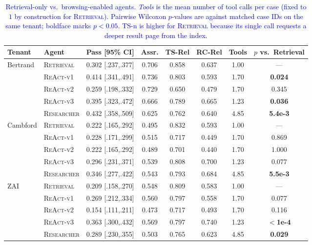 \begin{table}[h]
\centering
\color{blue}
\caption{\textcolor{blue}{Retrieval-only vs.\ browsing-enabled agents. \textit{Tools} is the mean number of tool calls per case (fixed to $1$ by construction for \textsc{Retrieval}). Pairwise Wilcoxon $p$-values are against matched case IDs on the same tenant; boldface marks $p<0.05$. TS-n is higher for \textsc{Retrieval} because its single call requests a deeper result page from the index.}}
\label{tab:tool_ablation}
\small
\begin{tabular}{llcccccc}
\toprule
\textbf{Tenant} & \textbf{Agent} & \textbf{Pass [95\% CI]} & \textbf{Assr.} & \textbf{TS-Rel} & \textbf{RC-Rel} & \textbf{Tools} & \textbf{$p$ vs.\ Retrieval} \\
\midrule
\multirow{4}{*}{Bertrand}
  & \textsc{Retrieval} & 0.302 [.237,.377] & 0.706 & 0.858 & 0.637 & 1.00 & --- \\
  & \textsc{ReAct-v1}  & 0.414 [.341,.491] & 0.736 & 0.803 & 0.593 & 1.70 & \textbf{0.024} \\
  & \textsc{ReAct-v2}  & 0.259 [.198,.332] & 0.729 & 0.650 & 0.479 & 1.70 & 0.345 \\
  & \textsc{ReAct-v3}  & 0.395 [.323,.472] & 0.666 & 0.789 & 0.665 & 1.23 & \textbf{0.036} \\
  & \textsc{Researcher}& 0.432 [.358,.509] & 0.625 & 0.762 & 0.640 & 4.85 & \textbf{5.4e-3} \\
\midrule
\multirow{4}{*}{Cambford}
  & \textsc{Retrieval} & 0.222 [.165,.292] & 0.495 & 0.832 & 0.593 & 1.00 & --- \\
  & \textsc{ReAct-v1}  & 0.228 [.171,.299] & 0.515 & 0.717 & 0.449 & 1.70 & 0.869 \\
  & \textsc{ReAct-v2}  & 0.222 [.165,.292] & 0.489 & 0.701 & 0.440 & 1.70 & 1.000 \\
  & \textsc{ReAct-v3}  & 0.296 [.231,.371] & 0.539 & 0.808 & 0.700 & 1.23 & 0.077 \\
  & \textsc{Researcher}& 0.346 [.277,.422] & 0.543 & 0.793 & 0.684 & 4.85 & \textbf{5.5e-3} \\
\midrule
\multirow{4}{*}{ZAI}
  & \textsc{Retrieval} & 0.209 [.158,.270] & 0.548 & 0.809 & 0.583 & 1.00 & --- \\
  & \textsc{ReAct-v1}  & 0.269 [.212,.334] & 0.560 & 0.797 & 0.558 & 1.70 & 0.077 \\
  & \textsc{ReAct-v2}  & 0.154 [.111,.211] & 0.473 & 0.717 & 0.493 & 1.70 & 0.116 \\
  & \textsc{ReAct-v3}  & 0.363 [.300,.432] & 0.569 & 0.797 & 0.740 & 1.23 & \textbf{$<$1e-4} \\
  & \textsc{Researcher}& 0.289 [.230,.355] & 0.503 & 0.765 & 0.623 & 4.85 & \textbf{0.029} \\
\bottomrule
\end{tabular}
\end{table}

